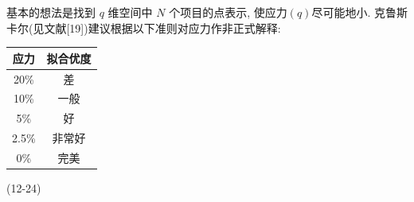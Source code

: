 基本的想法是找到 $q$ 维空间中 $N$ 个项目的点表示, 使应力$(q)$尽可能地小. 克鲁斯卡尔(见文献[19])建议根据以下准则对应力作非正式解释:

\begin{mvtable}
\begin{tabular}{cc}
\toprule
应力 & 拟合优度\\
\midrule
20\% & 差\\
10\% & 一般\\
5\% & 好\\
2.5\% & 非常好\\
0\% & 完美\\
\bottomrule
\end{tabular}
\end{mvtable}

\noindent\hfill (12-24)\hspace*{1em}
